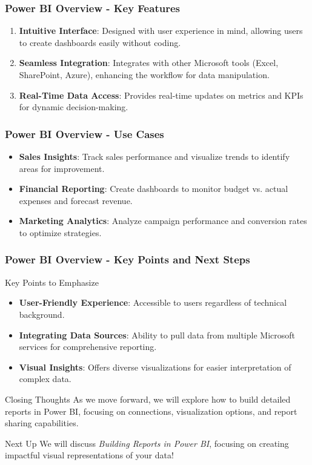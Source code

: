 \documentclass[aspectratio=169]{beamer}
\begin{document}
\begin{frame}[fragile]
    \frametitle{Power BI Overview - Key Features}
    \begin{enumerate}
        \item \textbf{Intuitive Interface}: Designed with user experience in mind, allowing users to create dashboards easily without coding.
        \item \textbf{Seamless Integration}: Integrates with other Microsoft tools (Excel, SharePoint, Azure), enhancing the workflow for data manipulation.
        \item \textbf{Real-Time Data Access}: Provides real-time updates on metrics and KPIs for dynamic decision-making.
    \end{enumerate}
\end{frame}

\begin{frame}[fragile]
    \frametitle{Power BI Overview - Use Cases}
    \begin{itemize}
        \item \textbf{Sales Insights}: Track sales performance and visualize trends to identify areas for improvement.
        \item \textbf{Financial Reporting}: Create dashboards to monitor budget vs. actual expenses and forecast revenue.
        \item \textbf{Marketing Analytics}: Analyze campaign performance and conversion rates to optimize strategies.
    \end{itemize}
\end{frame}

\begin{frame}[fragile]
    \frametitle{Power BI Overview - Key Points and Next Steps}
    \begin{block}{Key Points to Emphasize}
        \begin{itemize}
            \item \textbf{User-Friendly Experience}: Accessible to users regardless of technical background.
            \item \textbf{Integrating Data Sources}: Ability to pull data from multiple Microsoft services for comprehensive reporting.
            \item \textbf{Visual Insights}: Offers diverse visualizations for easier interpretation of complex data.
        \end{itemize}
    \end{block}
    \begin{block}{Closing Thoughts}
        As we move forward, we will explore how to build detailed reports in Power BI, focusing on connections, visualization options, and report sharing capabilities.
    \end{block}
    \begin{block}{Next Up}
        We will discuss \textit{Building Reports in Power BI}, focusing on creating impactful visual representations of your data!
    \end{block}
\end{frame}
\end{document}
